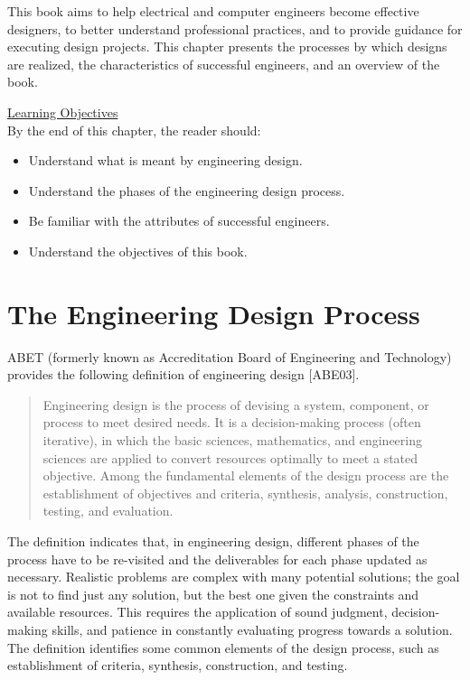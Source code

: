 \documentclass[a4paper,10pt]{book}
\begin{document}
This book aims to help electrical and computer engineers become
effective designers, to better understand professional practices, and to
provide guidance for executing design projects. This chapter presents
the processes by which designs are realized, the characteristics of
successful engineers, and an overview of the book.

\underline{Learning Objectives} \\
By the end of this chapter, the reader should:
\begin{itemize}
\itemsep0em 
\item Understand what is meant by engineering design.
\item  Understand the phases of the engineering design process.
\item  Be familiar with the attributes of successful engineers.
\item  Understand the objectives of this book.
\end{itemize}

\section{The Engineering Design Process}

ABET (formerly known as Accreditation Board of Engineering and
Technology) provides the following definition of engineering design
{[}ABE03{]}.

\begin{quote}
Engineering design is the process of devising a system, component, or
process to meet desired needs. It is a decision-making process (often
iterative), in which the basic sciences, mathematics, and engineering
sciences are applied to convert resources optimally to meet a stated
objective. Among the fundamental elements of the design process are the
establishment of objectives and criteria, synthesis, analysis,
construction, testing, and evaluation.
\end{quote}

The definition indicates that, in engineering design, different phases
of the process have to be re-visited and the deliverables for each phase
updated as necessary. Realistic problems are complex with many potential
solutions; the goal is not to find just any solution, but the best one
given the constraints and available resources. This requires the
application of sound judgment, decision-making skills, and patience in
constantly evaluating progress towards a solution. The definition
identifies some common elements of the design process, such as
establishment of criteria, synthesis, construction, and testing.
\end{document}
